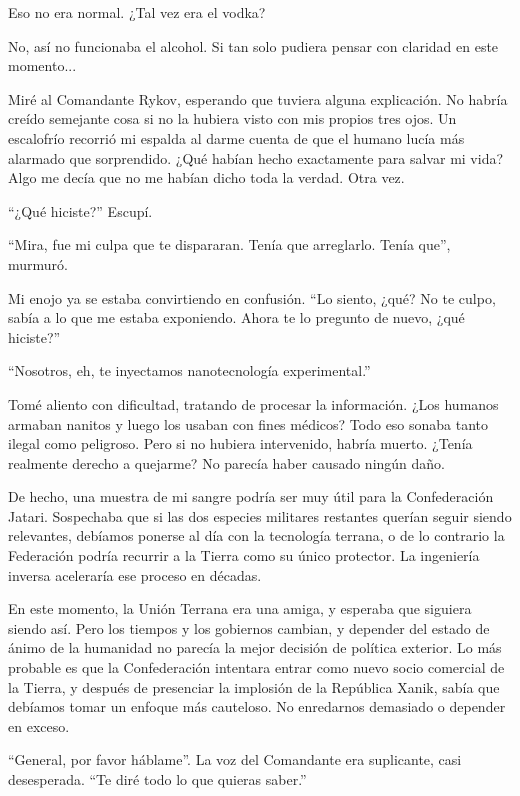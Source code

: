 \documentclass[spanish,12pt,a4paper,oneside,titlepage]{book}
\begin{document}
    Eso no era normal. ¿Tal vez era el vodka?

    No, así no funcionaba el alcohol. Si tan solo pudiera pensar con claridad en este momento...

    Miré al Comandante Rykov, esperando que tuviera alguna explicación. No habría creído semejante cosa si no la hubiera visto con mis propios tres ojos. Un escalofrío recorrió mi espalda al darme cuenta de que el humano lucía más alarmado que sorprendido. ¿Qué habían hecho exactamente para salvar mi vida? Algo me decía que no me habían dicho toda la verdad. Otra vez.

    ``¿Qué hiciste?'' Escupí.

    ``Mira, fue mi culpa que te dispararan. Tenía que arreglarlo. Tenía que'', murmuró.

    Mi enojo ya se estaba convirtiendo en confusión. ``Lo siento, ¿qué? No te culpo, sabía a lo que me estaba exponiendo. Ahora te lo pregunto de nuevo, ¿qué hiciste?''

    ``Nosotros, eh, te inyectamos nanotecnología experimental.''

    Tomé aliento con dificultad, tratando de procesar la información. ¿Los humanos armaban nanitos y luego los usaban con fines médicos? Todo eso sonaba tanto ilegal como peligroso. Pero si no hubiera intervenido, habría muerto. ¿Tenía realmente derecho a quejarme? No parecía haber causado ningún daño.

    De hecho, una muestra de mi sangre podría ser muy útil para la Confederación Jatari. Sospechaba que si las dos especies militares restantes querían seguir siendo relevantes, debíamos ponerse al día con la tecnología terrana, o de lo contrario la Federación podría recurrir a la Tierra como su único protector. La ingeniería inversa aceleraría ese proceso en décadas.

    En este momento, la Unión Terrana era una amiga, y esperaba que siguiera siendo así. Pero los tiempos y los gobiernos cambian, y depender del estado de ánimo de la humanidad no parecía la mejor decisión de política exterior. Lo más probable es que la Confederación intentara entrar como nuevo socio comercial de la Tierra, y después de presenciar la implosión de la República Xanik, sabía que debíamos tomar un enfoque más cauteloso. No enredarnos demasiado o depender en exceso.

    ``General, por favor háblame''. La voz del Comandante era suplicante, casi desesperada. ``Te diré todo lo que quieras saber.''
\end{document}
